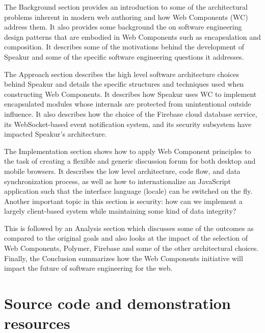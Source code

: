 The Background section provides an introduction to some of the architectural problems inherent in modern web authoring and how Web Components (WC) address them. 
It also provides some background the on software engineering design patterns that are embodied in Web Components such as encapsulation and composition.
It describes some of the motivations behind the development of Speakur and some of the specific software engineering questions it addresses.

The Approach section describes the high level software architecture choices behind Speakur and details the specific structures and techniques used when constructing Web Components.
It describes how Speakur uses WC to implement encapsulated modules whose internals are protected from unintentional outside influence. 
It also describes how the choice of the Firebase cloud database service, its WebSocket-based event notification system, and its security subsystem have impacted Speakur's architecture.

The Implementation section shows how to apply Web Component principles to the task of creating a flexible and generic discussion forum for both desktop and mobile browsers. 
It describes the low level architecture, code flow, and data synchronization process, 
as well as how to internationalize an JavaScript application such that the interface language (locale) can be switched on the fly.
Another important topic in this section is security: how can we implement a largely client-based system while maintaining some kind of data integrity?

This is followed by an Analysis section which discusses some of the outcomes 
as compared to the original goals and also looks at the impact of the selection of Web Components, 
Polymer, Firebase and some of the other architectural choices. 
Finally, the Conclusion summarizes how the Web Components initiative will impact the future of software engineering for the web. 

\section{Source code and demonstration resources}
%

